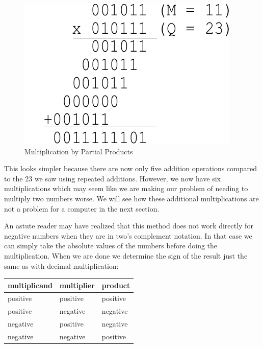 \documentclass{article}
\begin{document}
\begin{figure}[h]
\centering
\includegraphics[scale=0.7]{saam3.pdf}
\caption{Multiplication by Partial Products}
\end{figure}

This looks simpler because there are now only five addition operations compared to the 23 we saw using repeated additions.
However, we now have six multiplications which may seem like we are making our problem of needing to multiply two numbers worse.
We will see how these additional multiplications are not a problem for a computer in the next section.%

An astute reader may have realized that this method does not work directly for negative numbers when they are in two's complement notation.
In that case we can simply take the absolute values of the numbers before doing the multiplication.
When we are done we determine the sign of the result just the same as with decimal multiplication:

\begin{center}
    \begin{tabular}{| l | l | l |}
        \hline
        multiplicand & multiplier & product \\
        \hline
        positive & positive & positive \\
        positive & negative & negative \\
        negative & positive & negative \\
        negative & negative & positive \\
        \hline
    \end{tabular}
\end{center}
\end{document}
